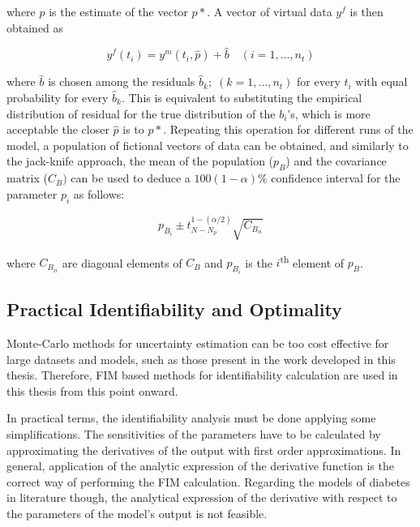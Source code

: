 where $\hat{p}$ is the estimate of the vector $p*$. A vector of virtual data $y^f$ is then obtained as

\begin{equation}
	y^f(t_i)=y^m(t_i,\hat{p})+\hat{b} \quad (i=1, \ldots , n_t)
\label{eq:bootstrapyf}
\end{equation}

where $\hat{b}$ is chosen among the residuals $\hat{b}_k; \; (k=1, \ldots , n_t)$ for every $t_i$ with equal probability for every $\hat{b}_k$. This is equivalent to substituting the empirical distribution of residual for the true distribution of the $b_i$'s, which is more acceptable the closer $\hat{p}$ is to $p*$. Repeating this operation for different runs of the model, a population of fictional vectors of data can be obtained, and similarly to the jack-knife approach, the mean of the population ($p_B$) and the covariance matrix ($C_B)$ can be used to deduce a $100(1-\alpha)\%$ confidence interval for the parameter $p_i$ as follows:

\begin{equation}
	p_{B_i}\pm t^{1-(\alpha/2)}_{N-N_p}\sqrt{C_{B_{ii}}}
\label{eq:bootstrapconfidence}
\end{equation}

where $C_{B_{ii}}$ are diagonal elements of $C_{B}$ and $p_{B_i}$ is the $i$\textsuperscript{th} element of $p_{B}$.

\subsection{Practical Identifiability and Optimality}
\label{sec:PracticalIdentifiability}

Monte-Carlo methods for uncertainty estimation can be too cost effective for large datasets and models, such as those present in the work developed in this thesis. Therefore, FIM based methods for identifiability calculation are used in this thesis from this point onward.

In practical terms, the identifiability analysis must be done applying some simplifications. The sensitivities of the parameters have to be calculated by approximating the derivatives of the output with first order approximations. In general, application of the analytic expression of the derivative function is the correct way of performing the FIM calculation. Regarding the models of diabetes in literature though, the analytical expression of the derivative with respect to the parameters of the model's output is not feasible.

